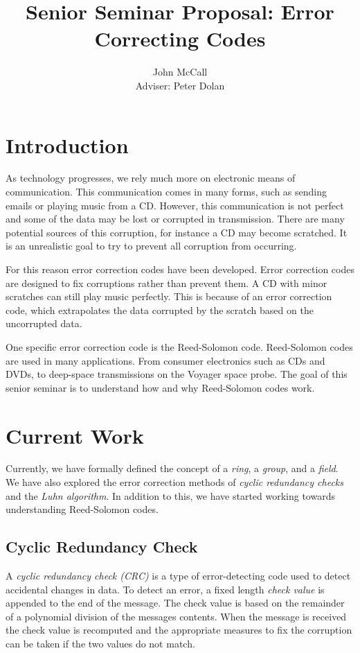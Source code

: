 \documentclass{article}
\begin{document}
\author{John McCall\\Adviser: Peter Dolan}
\title{Senior Seminar Proposal: Error Correcting Codes}

\maketitle


\section{Introduction}
As technology progresses, we rely much more on electronic means of communication.
This communication comes in many forms, such as sending emails or playing music 
from a CD. However, this communication is not perfect and some of the data
may be lost or corrupted in transmission. There are many potential sources
of this corruption, for instance a CD may become scratched. It is an unrealistic
goal to try to prevent all corruption from occurring.

For this reason error correction codes have been developed. Error correction
codes are designed to fix corruptions rather than prevent them. A CD with
minor scratches can still play music perfectly. This is because of
an error correction code, which extrapolates the data corrupted by the
scratch based on the uncorrupted data.

One specific error correction code is the Reed-Solomon code. Reed-Solomon codes
are used in many applications. From consumer electronics such as CDs and DVDs,
to deep-space transmissions on the Voyager space probe. The goal of this
senior seminar is to understand how and why Reed-Solomon codes work. 

\section{Current Work}
Currently, we have formally defined the concept of a \textit{ring}, a \textit{group},
and a \textit{field}. We have also explored the error correction methods of
\textit{cyclic redundancy checks} and the \textit{Luhn algorithm}. In addition
to this, we have started working towards understanding Reed-Solomon codes.

\subsection{Cyclic Redundancy Check}
A \textit{cyclic redundancy check (CRC)} is a type of error-detecting code used to detect accidental changes in data.
To detect an error, a fixed length \textit{check value} is appended to the end of the message. The check value is
based on the remainder of a polynomial division of the messages contents. When the message is received the check value
is recomputed and the appropriate measures to fix the corruption can be taken if the two values do not match.
\end{document}
